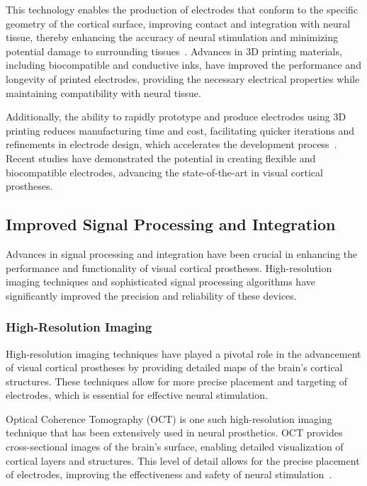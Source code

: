 \documentclass[twocolumn,10pt]{article}
\begin{document}
This technology enables the production of electrodes that conform to the
specific geometry of the cortical surface, improving contact and integration
with neural tissue, thereby enhancing the accuracy of neural stimulation and
minimizing potential damage to surrounding
tissues~\parencite{liuSoftElasticHydrogelbased2019}. Advances in 3D printing
materials, including biocompatible and conductive inks, have improved the
performance and longevity of printed electrodes, providing the necessary
electrical properties while maintaining compatibility with neural tissue.

Additionally, the ability to rapidly prototype and produce electrodes using 3D
printing reduces manufacturing time and cost, facilitating quicker iterations
and refinements in electrode design, which accelerates the development
process~\parencite{zhangClimbinginspiredTwiningElectrodes2019}. Recent studies
have demonstrated the potential in creating flexible and biocompatible
electrodes, advancing the state-of-the-art in visual cortical prostheses.

\subsection*{Improved Signal Processing and Integration}
Advances in signal processing and integration have been crucial in enhancing the
performance and functionality of visual cortical prostheses. High-resolution
imaging techniques and sophisticated signal processing algorithms have
significantly improved the precision and reliability of these devices.

\subsubsection*{High-Resolution Imaging}
High-resolution imaging techniques have played a pivotal role in the advancement
of visual cortical prostheses by providing detailed maps of the brain's cortical
structures. These techniques allow for more precise placement and targeting of
electrodes, which is essential for effective neural stimulation.

Optical Coherence Tomography (OCT) is one such high-resolution imaging technique
that has been extensively used in neural prosthetics. OCT provides
cross-sectional images of the brain's surface, enabling detailed visualization
of cortical layers and structures. This level of detail allows for the precise
placement of electrodes, improving the effectiveness and safety of neural
stimulation~\parencite{xieUseOpticalCoherence2022}.
\end{document}
